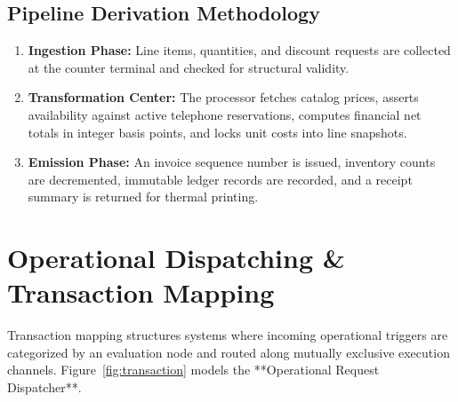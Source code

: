 \documentclass[12pt, a4paper]{report}
\begin{document}
\section{Pipeline Derivation Methodology}
\begin{enumerate}[leftmargin=1.5em]
  \item \textbf{Ingestion Phase:} Line items, quantities, and discount requests are collected at the counter terminal and checked for structural validity.
  \item \textbf{Transformation Center:} The processor fetches catalog prices, asserts availability against active telephone reservations, computes financial net totals in integer basis points, and locks unit costs into line snapshots.
  \item \textbf{Emission Phase:} An invoice sequence number is issued, inventory counts are decremented, immutable ledger records are recorded, and a receipt summary is returned for thermal printing.
\end{enumerate}

\chapter{Operational Dispatching \& Transaction Mapping}
Transaction mapping structures systems where incoming operational triggers are categorized by an evaluation node and routed along mutually exclusive execution channels. Figure~\ref{fig:transaction} models the **Operational Request Dispatcher**.
\end{document}
